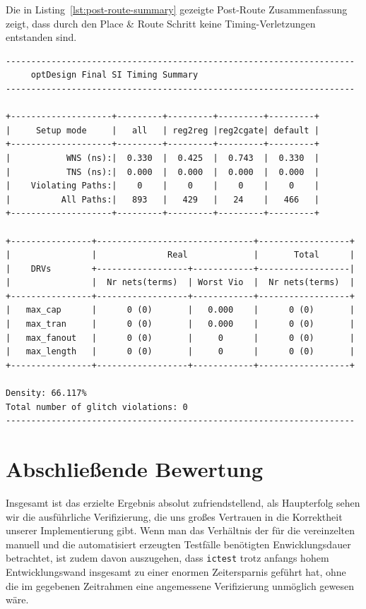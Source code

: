 \documentclass[ngerman, cd=lightcolor]{tudscrreprt}
\begin{document}
\noindent
Die in Listing~\ref{lst:post-route-summary} gezeigte Post-Route Zusammenfassung
zeigt, dass durch den Place \& Route Schritt keine Timing-Verletzungen
entstanden sind.

\begin{center}
  \begin{minipage}{0.65\textwidth}
    \begin{verbatim}
---------------------------------------------------------------------
     optDesign Final SI Timing Summary
---------------------------------------------------------------------

+--------------------+---------+---------+---------+---------+
|     Setup mode     |   all   | reg2reg |reg2cgate| default |
+--------------------+---------+---------+---------+---------+
|           WNS (ns):|  0.330  |  0.425  |  0.743  |  0.330  |
|           TNS (ns):|  0.000  |  0.000  |  0.000  |  0.000  |
|    Violating Paths:|    0    |    0    |    0    |    0    |
|          All Paths:|   893   |   429   |   24    |   466   |
+--------------------+---------+---------+---------+---------+

+----------------+-------------------------------+------------------+
|                |              Real             |       Total      |
|    DRVs        +------------------+------------+------------------|
|                |  Nr nets(terms)  | Worst Vio  |  Nr nets(terms)  |
+----------------+------------------+------------+------------------+
|   max_cap      |      0 (0)       |   0.000    |      0 (0)       |
|   max_tran     |      0 (0)       |   0.000    |      0 (0)       |
|   max_fanout   |      0 (0)       |     0      |      0 (0)       |
|   max_length   |      0 (0)       |     0      |      0 (0)       |
+----------------+------------------+------------+------------------+

Density: 66.117%
Total number of glitch violations: 0
---------------------------------------------------------------------
    \end{verbatim}
  \end{minipage}
\end{center}

\chapter{Abschließende Bewertung}

Insgesamt ist das erzielte Ergebnis absolut zufriendstellend, als Haupterfolg
sehen wir die ausführliche Verifizierung, die uns großes Vertrauen in die
Korrektheit unserer Implementierung gibt. Wenn man das Verhältnis der für die
vereinzelten manuell und die automatisiert erzeugten Testfälle benötigten
Enwicklungsdauer betrachtet, ist zudem davon auszugehen, dass \texttt{ictest}
trotz anfangs hohem Entwicklungswand insgesamt zu einer enormen Zeitersparnis
geführt hat, ohne die im gegebenen Zeitrahmen eine angemessene Verifizierung
unmöglich gewesen wäre.
\end{document}
